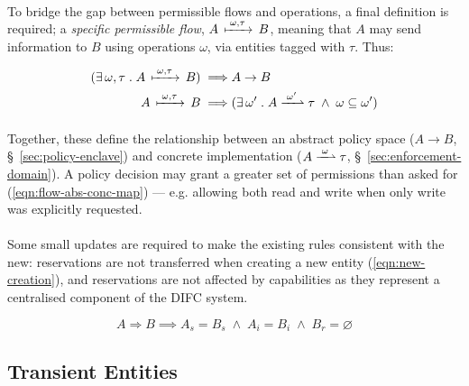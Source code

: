 \paragraph{} To bridge the gap between permissible flows and operations, a final definition is required; a \textit{specific permissible flow}, $A \,\xmapsto{\;\omega,\tau\;}\, B$, meaning that $A$ may send information to $B$ using operations $\omega$, via entities tagged with $\tau$. Thus:

\vspace{-7mm}
\begin{align}
    (\exists\, \omega,\tau \;.\; A \,\xmapsto{\;\omega,\tau\;}\, B) \implies & A \rightarrow B \\
    A \,\xmapsto{\;\omega,\tau\;}\, B \implies & (\exists \,\omega' \;.\; A \xrightharpoonup{\;\omega'\;} \tau \;\land\; \omega \subseteq \omega') \label{eqn:flow-abs-conc-map}
\end{align}

\paragraph{} Together, these define the relationship between an abstract policy space ($A \rightarrow B$, §~\ref{sec:policy-enclave}) and concrete implementation ($A \xrightharpoonup{\;\omega\;} \tau$, §~\ref{sec:enforcement-domain}). A policy decision may grant a greater set of permissions than asked for (\ref{eqn:flow-abs-conc-map}) --- e.g. allowing both read and write when only write was explicitly requested.~\cite{flume,Zeldovich2008}

\paragraph{} Some small updates are required to make the existing rules consistent with the new: reservations are not transferred when creating a new entity (\ref{eqn:new-creation}), and reservations are not affected by capabilities as they represent a centralised component of the DIFC system. 

\vspace{-5mm}
\begin{equation}
    A \Rightarrow B \implies A_s = B_s \; \wedge \; A_i = B_i \; \wedge \; B_r = \varnothing \label{eqn:new-creation}
\end{equation}


\subsection{Transient Entities}
\label{sec:transient-entities}

